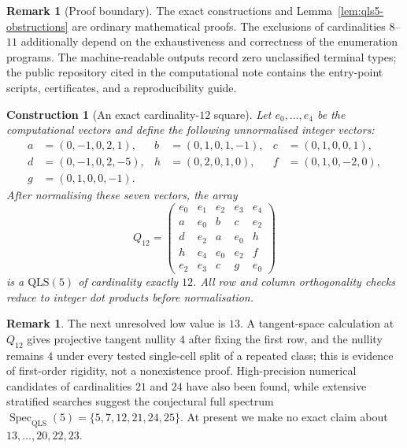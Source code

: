 \documentclass[11pt]{amsart}
\newtheorem{construction}[theorem]{Construction}
\theoremstyle{definition}
\newtheorem{remark}[theorem]{Remark}
\newcommand{\QLS}{\mathrm{QLS}}
\begin{document}
\begin{remark}[Proof boundary]\label{rem:qls5-proof-boundary}
The exact constructions and Lemma~\ref{lem:qls5-obstructions} are ordinary
mathematical proofs.  The exclusions of cardinalities $8$--$11$ additionally
depend on the exhaustiveness and correctness of the enumeration programs.
The machine-readable outputs record zero unclassified terminal types; the
public repository cited in the computational note contains the entry-point
scripts, certificates, and a reproducibility guide.
\end{remark}

\begin{construction}[An exact cardinality-$12$ square]\label{con:qls5-c12}
Let $e_0,\dots,e_4$ be the computational vectors and define the following
unnormalised integer vectors:
\[
\begin{aligned}
a&=(0,-1,0,2,1), & b&=(0,1,0,1,-1), & c&=(0,1,0,0,1),\\
d&=(0,-1,0,2,-5), & h&=(0,2,0,1,0), & f&=(0,1,0,-2,0),\\
g&=(0,1,0,0,-1). &&
\end{aligned}
\]
After normalising these seven vectors, the array
\[
Q_{12}=
\begin{pmatrix}
e_0 & e_1 & e_2 & e_3 & e_4\\
a   & e_0 & b   & c   & e_2\\
d   & e_2 & a   & e_0 & h\\
h   & e_4 & e_0 & e_2 & f\\
e_2 & e_3 & c   & g   & e_0
\end{pmatrix}
\]
is a $\QLS(5)$ of cardinality exactly $12$.  All row and column
orthogonality checks reduce to integer dot products before normalisation.
\end{construction}

\begin{remark}\label{rem:qls5-next}
The next unresolved low value is $13$.  A tangent-space calculation at
$Q_{12}$ gives projective tangent nullity $4$ after fixing the first row,
and the nullity remains $4$ under every tested single-cell split of a
repeated class; this is evidence of first-order rigidity, not a
nonexistence proof.  High-precision numerical candidates of cardinalities
$21$ and $24$ have also been found, while extensive stratified searches suggest
the conjectural full spectrum
$\operatorname{Spec}_{\QLS}(5)=\{5,7,12,21,24,25\}$.
At present we make no exact claim about $13,\dots,20,22,23$.
\end{remark}
\end{document}
